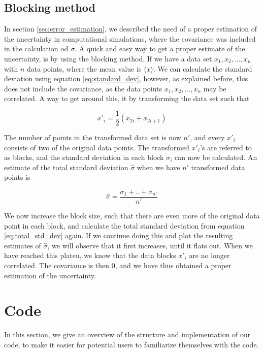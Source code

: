 \documentclass[norsk,a4paper,12pt]{article}
\begin{document}
\subsection{Blocking method} \label{sec:Blocking}
In section \ref{sec:error_estimation}, we described the need of a proper estimation of the uncertainty in computational simulations, where the covariance was included in the calculation od $\sigma$. A quick and easy way to get a proper estimate of the uncertainty, is by using the blocking method. If we have a data set ${x_1, x_2, ..., x_n }$ with $n$ data points, where the mean value is $\langle x \rangle$. We can calculate the standard deviation using equation \ref{eq:standard_dev}, however, as explained before, this does not include the covariance, as the data points ${x_1, x_2, ..., x_n }$  may be correlated.  A way to get around this, it by transforming the data set such that

\begin{equation}
x'_i = \frac{1}{2}(x_{2i} + x_{2i+1})
\end{equation}

The number of points in the transformed data set is now $n'$, and every $x'_i$ consists of two of the original data points. The transformed $x'_i$'s are referred to as blocks, and the standard deviation in each block $\sigma_i$ can now be calculated. An estimate of the total standard deviation $\hat{\sigma}$ when we have $n'$ transformed data points is

\begin{equation}
	\label{eq:total_std_dev}
	\hat{\sigma} = \frac{\sigma_1 + .. + \sigma_{n'}}{n'}
\end{equation} 

We now increase the block size, such that there are even more of the original data point in each block, and calculate the total standard deviation from equation \ref{eq:total_std_dev} again. If we continue doing this and plot the resulting estimates of $\hat{\sigma}$, we will observe that it first increases, until it flats out. When we have reached this plateu, we know that the data blocks $x'_i$ are no longer correlated. The covariance is then 0, and we have thus obtained a proper estimation of the uncertainty. 

\section{Code}
In this section, we give an overview of the structure and implementation of our code, to make it easier for potential users to familiarize themselves with the code. 
\end{document}
